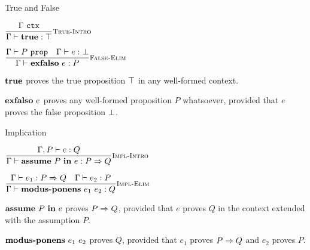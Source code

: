 \documentclass{beamer}
\begin{document}
\begin{frame}{True and False}

\begin{center}
  $\infrule[True-Intro]{\ctx{\Gamma}}{\proves{\trueintro}{\True}}$

  \vspace{2em}

  $\infrule[False-Elim]{\prop{P} \quad \proves{e}{\False}}{\proves{\falseelim{e}}{P}}$
\end{center}

\vspace{2em}

$\textbf{true}$ proves the true proposition $\top$ in any well-formed context.

\vspace{1em}

$\textbf{exfalso}\ e$ proves any well-formed proposition $P$ whatsoever, provided that $e$ proves the false proposition $\bot$.

\end{frame}

\begin{frame}{Implication}

\begin{center}
  $\infrule[Impl-Intro]{\proves[\assume{\Gamma}{P}]{e}{Q}}{\proves{\implintro{P}{e}}{\Impl{P}{Q}}}$

  \vspace{2em}

  $\infrule[Impl-Elim]{\proves{e_1}{\Impl{P}{Q}} \quad \proves{e_2}{P}}{\proves{\implelim{e_1}{e_2}}{Q}}$
\end{center}

\vspace{2em}

$\textbf{assume}\ P\ \textbf{in}\ e$ proves $P \Rightarrow Q$, provided that $e$ proves $Q$ in the context extended with the assumption $P$.

\vspace{1em}

$\textbf{modus-ponens}\ e_1\ e_2$ proves $Q$, provided that $e_1$ proves $P \Rightarrow Q$ and $e_2$ proves $P$.

\end{frame}
\end{document}
